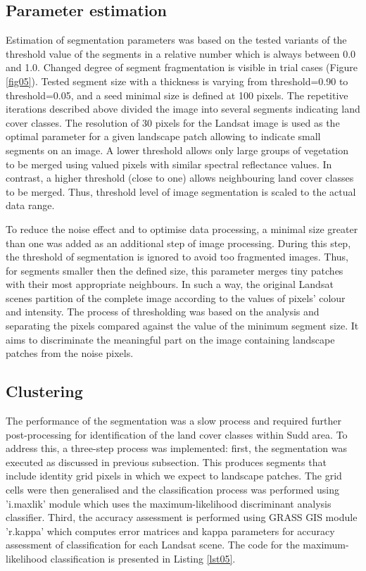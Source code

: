 \documentclass[analytics,article,submit,pdftex,moreauthors]{Definitions/mdpi}
\begin{document}
\subsection{Parameter estimation}

Estimation of segmentation parameters was based on the tested variants of the threshold value of the segments in a relative number which is always between 0.0 and 1.0. Changed degree of segment fragmentation is visible in trial cases (Figure \ref{fig05}). Tested segment size with a thickness is varying from threshold=0.90 to threshold=0.05, and a seed minimal size is defined at 100 pixels. The repetitive iterations described above divided the image into several segments indicating land cover classes. The resolution of 30 pixels for the Landsat image is used as the optimal parameter for a given landscape patch allowing to indicate small segments on an image. A lower threshold allows only large groups of vegetation to be merged using valued pixels with similar spectral reflectance values. In contrast, a higher threshold (close to one) allows neighbouring land cover classes to be merged. Thus, threshold level of image segmentation is scaled to the actual data range.

To reduce the noise effect and to optimise data processing, a minimal size greater than one was added as an additional step of image processing. During this step, the threshold of segmentation is ignored to avoid too fragmented images. Thus, for segments smaller then the defined size, this parameter merges tiny patches with their most appropriate neighbours. In such a way, the original Landsat scenes partition of the complete image according to the values of pixels' colour and intensity. The process of thresholding was based on the analysis and separating the pixels compared against the value of the minimum segment size. It aims to discriminate the meaningful part on the image containing landscape patches from the noise pixels.

\subsection{Clustering}

The performance of the segmentation was a slow process and required further post-processing for identification of the land cover classes within Sudd area. To address this, a three-step process was implemented: first, the segmentation was executed as discussed in previous subsection. This produces segments that include identity grid pixels in which we expect to landscape patches. The grid cells were then generalised and the classification process was performed using 'i.maxlik' module which uses the maximum-likelihood discriminant analysis classifier. Third, the accuracy assessment is performed using GRASS GIS module 'r.kappa' which computes error matrices and kappa parameters for accuracy assessment of classification for each Landsat scene. The code for the maximum-likelihood classification is presented in Listing \ref{lst05}.
\end{document}
